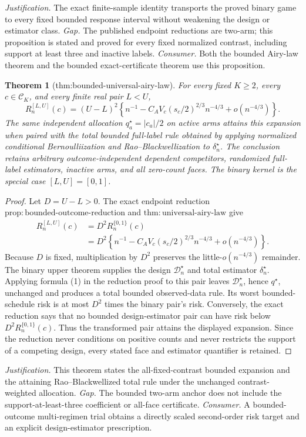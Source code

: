 \documentclass{article}
\newtheorem{theorem}{Theorem}
\begin{document}
\par\smallskip\noindent \textit{Justification.} The exact finite-sample identity transports the proved binary game to every fixed bounded response interval without weakening the design or estimator class. \textit{Gap.} The published endpoint reductions are two-arm; this proposition is stated and proved for every fixed normalized contrast, including support at least three and inactive labels. \textit{Consumer.} Both the bounded Airy-law theorem and the bounded exact-certificate theorem use this proposition.

\begin{theorem}[thm:bounded-universal-airy-law]\label{thm:bounded-universal-airy-law}
For every fixed \(K\ge2\), every \(c\in\mathcal C_K\), and every finite real pair \(L<U\),
\[
R_n^{[L,U]}(c)
=(U-L)^2\left\{
n^{-1}-C_AV_c(s_c/2)^{2/3}n^{-4/3}+o(n^{-4/3})
\right\}.
\]
The same independent allocation \(q_a^\star=|c_a|/2\) on active arms attains this expansion when paired with the total bounded full-label rule obtained by applying normalized conditional Bernoulliization and Rao--Blackwellization to \(\delta_n^\star\).  The conclusion retains arbitrary outcome-independent dependent competitors, randomized full-label estimators, inactive arms, and all zero-count faces.  The binary kernel is the special case \([L,U]=[0,1]\).
\end{theorem}
\begin{proof}
Let \(D=U-L>0\).  The exact endpoint reduction \(\mathrm{prop:bounded\text{-}outcome\text{-}reduction}\) and \(\mathrm{thm:universal\text{-}airy\text{-}law}\) give
\[
\begin{aligned}
R_n^{[L,U]}(c)
&=D^2R_n^{\{0,1\}}(c)\\
&=D^2\left\{
n^{-1}-C_AV_c(s_c/2)^{2/3}n^{-4/3}+o(n^{-4/3})
\right\}.
\end{aligned}
\]
Because \(D\) is fixed, multiplication by \(D^2\) preserves the little-\(o(n^{-4/3})\) remainder.  The binary upper theorem supplies the design \(\mathcal D_n^\star\) and total estimator \(\delta_n^\star\).  Applying formula (1) in the reduction proof to this pair leaves \(\mathcal D_n^\star\), hence \(q^\star\), unchanged and produces a total bounded observed-data rule.  Its worst bounded-schedule risk is at most \(D^2\) times the binary pair's risk.  Conversely, the exact reduction says that no bounded design-estimator pair can have risk below \(D^2R_n^{\{0,1\}}(c)\).  Thus the transformed pair attains the displayed expansion.  Since the reduction never conditions on positive counts and never restricts the support of a competing design, every stated face and estimator quantifier is retained.
\end{proof}
\par\smallskip\noindent \textit{Justification.} This theorem states the all-fixed-contrast bounded expansion and the attaining Rao--Blackwellized total rule under the unchanged contrast-weighted allocation. \textit{Gap.} The bounded two-arm anchor does not include the support-at-least-three coefficient or all-face certificate. \textit{Consumer.} A bounded-outcome multi-regimen trial obtains a directly scaled second-order risk target and an explicit design-estimator prescription.
\end{document}

